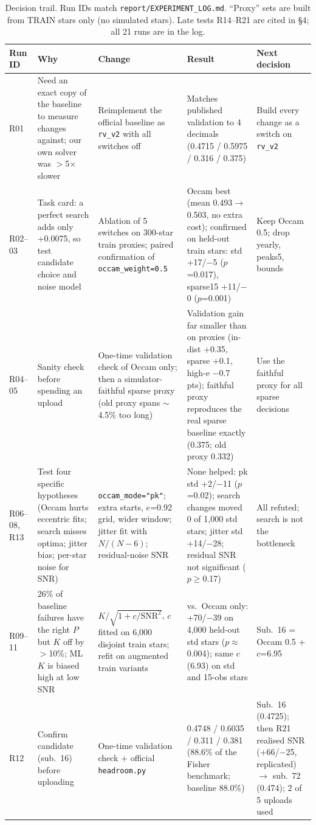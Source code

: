 \documentclass{article}
\begin{document}
\begin{table}[ht]
\caption{Decision trail. Run IDs match \texttt{report/EXPERIMENT\_LOG.md}.
``Proxy'' sets are built from TRAIN stars only (no simulated stars). Late tests R14--R21 are cited in \S4; all 21 runs are in the log.}
\label{tab:trajectory}
\centering\small
\begin{tabularx}{\textwidth}{@{}lXXXX@{}}
\toprule
Run ID & Why & Change & Result & Next decision \\
\midrule
R01 & Need an exact copy of the baseline to measure changes against; our own solver was $>$5$\times$ slower & Reimplement the official baseline as \texttt{rv\_v2} with all switches off &
  Matches published validation to 4 decimals (0.4715 / 0.5975 / 0.316 / 0.375) & Build every change as a switch on \texttt{rv\_v2} \\
R02--03 & Task card: a perfect search adds only +0.0075, so test candidate choice and noise model & Ablation of 5 switches on 300-star train proxies; paired confirmation of \texttt{occam\_weight=0.5} &
  Occam best (mean 0.493$\to$0.503, no extra cost); confirmed on held-out train stars: std +17/$-$5 ($p$=0.017), sparse15 +11/$-$0 ($p$=0.001) & Keep Occam 0.5; drop yearly, peaks5, bounds \\
R04--05 & Sanity check before spending an upload & One-time validation check of Occam only; then a simulator-faithful sparse proxy (old proxy spans $\sim$4.5\% too long) &
  Validation gain far smaller than on proxies (in-dist +0.35, sparse +0.1, high-e $-$0.7 pts); faithful proxy reproduces the real sparse baseline exactly (0.375; old proxy 0.332) & Use the faithful proxy for all sparse decisions \\
R06--08, R13 & Test four specific hypotheses (Occam hurts eccentric fits; search misses optima; jitter bias; per-star noise for SNR) & \texttt{occam\_mode="pk"}; extra starts, $e$=0.92 grid, wider window; jitter fit with $N/(N-6)$; residual-noise SNR &
  None helped: pk std +2/$-$11 ($p$=0.02); search changes moved 0 of 1,000 std stars; jitter std +14/$-$28; residual SNR not significant ($p\ge$0.17) & All refuted; search is not the bottleneck \\
R09--11 & 26\% of baseline failures have the right $P$ but $K$ off by $>$10\%; ML $K$ is biased high at low SNR & $K/\sqrt{1+c/\mathrm{SNR}^2}$, $c$ fitted on 6,000 disjoint train stars; refit on augmented train variants &
  vs.\ Occam only: +70/$-$39 on 4,000 held-out std stars ($p\approx$0.004); same $c$ (6.93) on std and 15-obs stars & Sub.\ 16 = Occam 0.5 + $c$=6.95 \\
R12 & Confirm candidate (sub.\ 16) before uploading & One-time validation check + official \texttt{headroom.py} &
  0.4748 / 0.6035 / 0.311 / 0.381 (88.6\% of the Fisher benchmark; baseline 88.0\%) & Sub.\ 16 (0.4725); then R21 realised SNR (+66/$-$25, replicated) $\to$ sub.\ 72 (0.474); 2 of 5 uploads used \\
\bottomrule
\end{tabularx}
\end{table}
\end{document}
